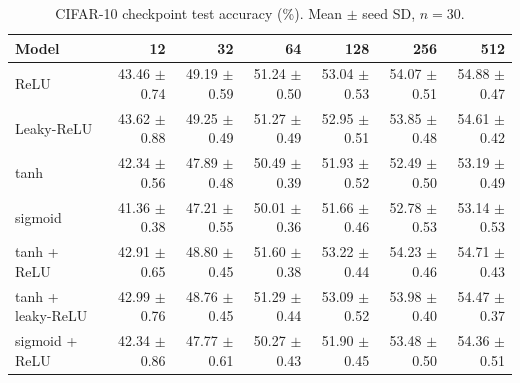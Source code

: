 \begin{table}[htbp]
\centering
\caption{CIFAR-10 checkpoint test accuracy (\%). Mean $\pm$ seed SD, $n=30$.}
\label{tab:cifar10:test_acc_best}
\footnotesize
\begin{tabular}{@{}lrrrrrr@{}}
\toprule
Model & 12 & 32 & 64 & 128 & 256 & 512 \\
\midrule
ReLU & 43.46 $\pm$ 0.74 & 49.19 $\pm$ 0.59 & 51.24 $\pm$ 0.50 & 53.04 $\pm$ 0.53 & 54.07 $\pm$ 0.51 & 54.88 $\pm$ 0.47 \\
Leaky-ReLU & 43.62 $\pm$ 0.88 & 49.25 $\pm$ 0.49 & 51.27 $\pm$ 0.49 & 52.95 $\pm$ 0.51 & 53.85 $\pm$ 0.48 & 54.61 $\pm$ 0.42 \\
tanh & 42.34 $\pm$ 0.56 & 47.89 $\pm$ 0.48 & 50.49 $\pm$ 0.39 & 51.93 $\pm$ 0.52 & 52.49 $\pm$ 0.50 & 53.19 $\pm$ 0.49 \\
sigmoid & 41.36 $\pm$ 0.38 & 47.21 $\pm$ 0.55 & 50.01 $\pm$ 0.36 & 51.66 $\pm$ 0.46 & 52.78 $\pm$ 0.53 & 53.14 $\pm$ 0.53 \\
tanh + ReLU & 42.91 $\pm$ 0.65 & 48.80 $\pm$ 0.45 & 51.60 $\pm$ 0.38 & 53.22 $\pm$ 0.44 & 54.23 $\pm$ 0.46 & 54.71 $\pm$ 0.43 \\
tanh + leaky-ReLU & 42.99 $\pm$ 0.76 & 48.76 $\pm$ 0.45 & 51.29 $\pm$ 0.44 & 53.09 $\pm$ 0.52 & 53.98 $\pm$ 0.40 & 54.47 $\pm$ 0.37 \\
sigmoid + ReLU & 42.34 $\pm$ 0.86 & 47.77 $\pm$ 0.61 & 50.27 $\pm$ 0.43 & 51.90 $\pm$ 0.45 & 53.48 $\pm$ 0.50 & 54.36 $\pm$ 0.51 \\
\bottomrule
\end{tabular}
\par{}
\end{table}
